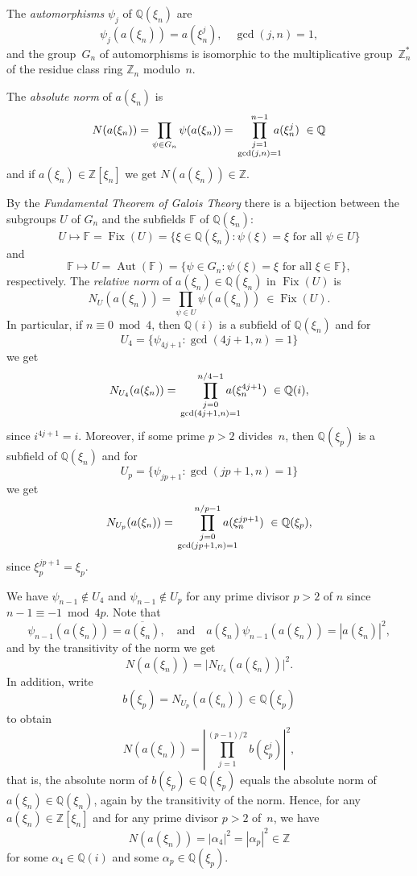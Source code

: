 \documentclass{article}
\theoremstyle{definition}
\newcommand{\Fix}{\operatorname{Fix}}
\newcommand{\Aut}{\operatorname{Aut}}
\newcommand{\Q}{\mathbb{Q}}
\begin{document}
The {\em automorphisms} $\psi_j$ of $\mathbb{Q}(\xi_n)$ are %
$$\psi_j(a(\xi_n))=a(\xi_n^j),\quad \gcd(j,n)=1,$$
and the group~$G_n$ of automorphisms is isomorphic to the multiplicative group~$\mathbb{Z}_n^*$ of the residue class ring $\mathbb{Z}_n$ modulo~$n$.

The {\em absolute norm} of $a(\xi_n)$ is
$$N(a(\xi_n))=\prod_{\psi \in G_n} \psi(a(\xi_n))=\prod_{\textstyle\genfrac{}{}{0pt}{}{j=1}{\gcd(j,n)=1}}^{n-1}\kern-10pt a(\xi_n^j)\ \in \mathbb{Q}$$
and if $a(\xi_n)\in \mathbb{Z}[\xi_n]$ we get $N(a(\xi_n))\in \mathbb{Z}.$

By the {\em Fundamental Theorem of Galois Theory} there is a bijection between the subgroups $U$ of $G_n$ and the subfields $\mathbb{F}$ of $\mathbb{Q}(\xi_n)$:
$$U\mapsto \mathbb{F}=\Fix(U)=\{\xi\in \mathbb{Q}(\xi_n): \psi(\xi)=\xi \text{ for all } \psi \in U\}$$
and $$\mathbb{F}\mapsto U=\Aut(\mathbb{F})=\{\psi\in G_n : \psi(\xi)=\xi \text{ for all }\xi\in \mathbb{F}\},$$
respectively.
The {\em relative norm} of $a(\xi_n)\in\Q(\xi_n)$ in $\Fix(U)$ is 
$$N_U(a(\xi_n))=\prod_{\psi \in U} \psi(a(\xi_n))\ \in \Fix(U).$$
In particular, if $n\equiv 0\bmod 4$, then $\mathbb{Q}(i)$ is a subfield of $\mathbb{Q}(\xi_n)$
and for 
$$U_4=\{\psi_{4j+1}: \gcd(4j+1,n)=1\}$$ we get
\begin{equation}\label{NU4}
N_{U_4}(a(\xi_n))=\prod_{\textstyle\genfrac{}{}{0pt}{}{j=0}{\gcd(4j+1,n)=1}}^{n/4-1} \kern-16pt a(\xi_n^{4j+1})\ \in \mathbb{Q}(i),
\end{equation}
since $i^{4j+1}=i$.
Moreover, if some prime $p>2$ divides~$n$, then $\mathbb{Q}(\xi_p)$ is a subfield of 
$\mathbb{Q}(\xi_n)$ and for 
$$U_p=\{\psi_{jp+1} : \gcd(jp+1,n)=1\}$$
we get
$$N_{U_p}(a(\xi_n))=\prod_{\textstyle\genfrac{}{}{0pt}{}{j=0}{\gcd(jp+1,n)=1}}^{n/p-1}\kern-16pt a(\xi_n^{jp+1})\ \in \mathbb{Q}(\xi_p),$$
since $\xi_p^{jp+1}=\xi_p$.


We have $\psi_{n-1}\not\in U_4$ and $\psi_{n-1}\not\in U_p$ for any prime divisor $p>2$ of $n$ since 
$n-1\equiv -1\bmod 4p$. Note that 
$$\psi_{n-1}(a(\xi_n))=\overline{a(\xi_n)},\quad \mbox{and}\quad a(\xi_n)\psi_{n-1}(a(\xi_n))=|a(\xi_n)|^2,$$ and by the transitivity of the norm we get
$$N(a(\xi_n))=\bigl|N_{U_4}(a(\xi_n))\bigr|^2.$$
In addition, write 
$$b(\xi_p)=N_{U_p}(a(\xi_n))\in \Q(\xi_p)$$
to obtain
$$N(a(\xi_n))=\left|\prod_{j=1}^{(p-1)/2}b(\xi_p^j) \right|^2,$$
that is, the absolute norm of $b(\xi_p)\in \Q(\xi_p)$ equals the absolute norm of $a(\xi_n)\in\Q(\xi_n)$, again by the transitivity of the norm.
Hence, for any $a(\xi_n)\in \mathbb{Z}[\xi_n]$ and for any prime divisor $p>2$ of~$n$, we have
\begin{equation}\label{alphap}
N(a(\xi_n))=|\alpha_4|^2=|\alpha_p|^2\in \mathbb{Z}
\end{equation}
for some $\alpha_4\in \mathbb{Q}(i)$ and some $\alpha_p\in \mathbb{Q}(\xi_p)$.
\end{document}
